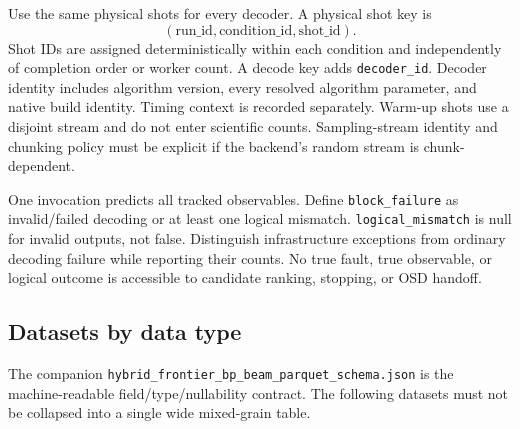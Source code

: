\documentclass[11pt,a4paper]{article}
\newcommand{\code}[1]{\nolinkurl{#1}}
\begin{document}
Use the same physical shots for every decoder. A physical shot key is
\begin{equation*}
 (\text{run\_id},\text{condition\_id},\text{shot\_id}).
\end{equation*}
Shot IDs are assigned deterministically within each condition and independently of completion order or worker count. A decode key adds \code{decoder_id}. Decoder identity includes algorithm version, every resolved algorithm parameter, and native build identity. Timing context is recorded separately. Warm-up shots use a disjoint stream and do not enter scientific counts. Sampling-stream identity and chunking policy must be explicit if the backend's random stream is chunk-dependent.

One invocation predicts all tracked observables. Define \code{block_failure} as invalid/failed decoding or at least one logical mismatch. \code{logical_mismatch} is null for invalid outputs, not false. Distinguish infrastructure exceptions from ordinary decoding failure while reporting their counts. No true fault, true observable, or logical outcome is accessible to candidate ranking, stopping, or OSD handoff.

\subsection{Datasets by data type}
The companion \code{hybrid_frontier_bp_beam_parquet_schema.json} is the machine-readable field/type/nullability contract. The following datasets must not be collapsed into a single wide mixed-grain table.
\end{document}
